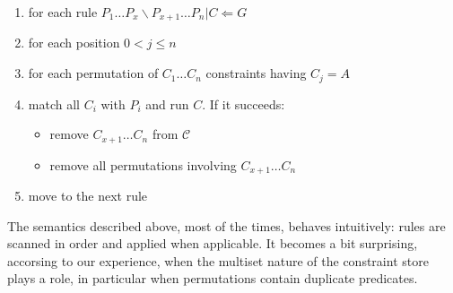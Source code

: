 \documentclass[a4paper, 11pt]{book}
\begin{document}
\begin{enumerate}
\item for each rule $P_1 \ldots P_x \backslash P_{x+1} \ldots P_n | C \Leftarrow G$
\item for each position $0 < j \leq n$
\item for each permutation of $C_1 \ldots C_n$ constraints having $C_j = A$
\item match all $C_i$ with $P_i$ and run $C$. If it succeeds:
  \begin{itemize}
    \item remove $C_{x+1} \ldots C_n$ from $\mathcal{C}$
    \item remove all permutations involving $C_{x+1} \ldots C_n$
  \end{itemize}
\item move to the next rule
\end{enumerate}

The semantics described above, most of the times, behaves intuitively: rules
are scanned in order and applied when applicable. It becomes a bit surprising,
accorsing to our experience, when the multiset nature of the constraint store
plays a role, in particular when permutations contain duplicate predicates.
\end{document}
